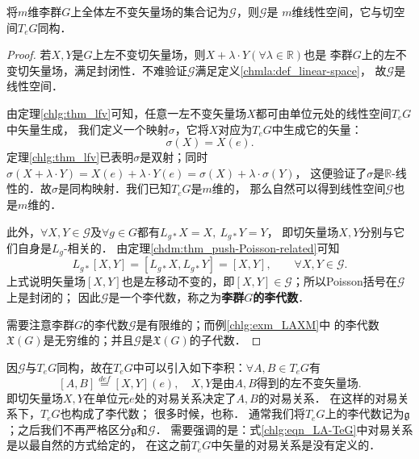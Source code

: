 \begin{theorem}\label{chlg:thm_lfvls}
    将$m$维李群$G$上全体左不变矢量场的集合记为$\mathscr{G}$，则$\mathscr{G}$是
    $m$维线性空间，它与切空间$T_eG$同构．
\end{theorem}
\begin{proof}
    若$X,Y$是$G$上左不变切矢量场，则$X+\lambda\cdot Y(\forall \lambda \in \mathbb{R})$也是
    李群$G$上的左不变切矢量场，满足封闭性．不难验证$\mathscr{G}$满足定义\ref{chmla:def_linear-space}，
    故$\mathscr{G}$是线性空间．
    
    由定理\ref{chlg:thm_lfv}可知，任意一左不变矢量场$X$都可由单位元处的线性空间$T_eG$中矢量生成，
    我们定义一个映射$\sigma$，它将$X$对应为$T_eG$中生成它的矢量：
    \begin{equation}
        \sigma (X) = X(e).
    \end{equation}
    定理\ref{chlg:thm_lfv}已表明$\sigma$是双射；同时$\sigma (X+\lambda \cdot Y)
    = X(e)+\lambda\cdot Y(e)=\sigma(X)+\lambda\cdot\sigma(Y)$，
    这便验证了$\sigma$是$\mathbb{R}$-线性的．故$\sigma$是同构映射．我们已知$T_eG$是$m$维的，
    那么自然可以得到线性空间$\mathscr{G}$也是$m$维的．
    
    此外，$\forall X,Y\in \mathscr{G}$及$\forall g\in G$都有$L_{g*}X=X,\ L_{g*}Y=Y$，
    即切矢量场$X,Y$分别与它们自身是$L_g$-相关的．
    由定理\ref{chdm:thm_push-Poisson-related}可知  %
    \begin{equation}\label{chlg:eqn_LgXY}
        L_{g*}[X,Y]=[L_{g*}X, L_{g*}Y]=[X,Y], \qquad \forall X,Y \in \mathscr{G}.
    \end{equation}
    上式说明矢量场$[X,Y]$也是左移动不变的，即$[X,Y]\in \mathscr{G}$；所以Poisson括号在$\mathscr{G}$上是封闭的；
    因此$\mathscr{G}$是一个李代数，称之为{\heiti \bfseries 李群$G$的李代数}．
    
    需要注意李群$G$的李代数$\mathscr{G}$是有限维的；而例\ref{chlg:exm_LAXM}中
    的李代数$\mathfrak{X}(G)$是无穷维的；并且$\mathscr{G}$是$\mathfrak{X}(G)$的子代数．
\end{proof}


因$\mathscr{G}$与$T_eG$同构，故在$T_eG$中可以引入如下李积：$\forall A, B \in T_eG$有
\begin{equation}\label{chlg:eqn_LA-TeG}
    [A, B] \overset{def}{=} [X,Y](e), \quad 
    X,Y \text{是由}A,B \text{得到的左不变矢量场}.
\end{equation}
即切矢量场$X,Y$在单位元$e$处的对易关系决定了$A, B$的对易关系．
在这样的对易关系下，$T_eG$也构成了李代数；
很多时候，也称．
通常我们将$T_eG$上的李代数记为$\mathfrak{g}$；之后我们不再严格区分$\mathfrak{g}$和$\mathscr{G}$．
需要强调的是：式\eqref{chlg:eqn_LA-TeG}中对易关系是以最自然的方式给定的，
在这之前$T_eG$中矢量的对易关系是没有定义的．

